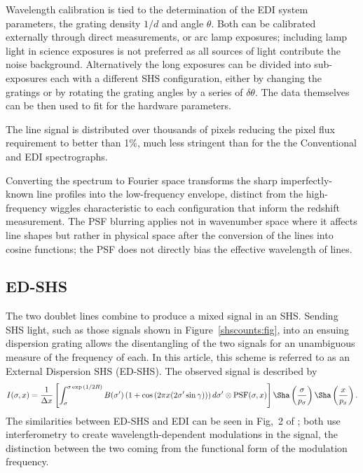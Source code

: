 \documentclass[preprint]{aastex}
\begin{document}
Wavelength calibration is tied to the determination of the EDI system parameters, the grating density $1/d$ and angle $\theta$.
Both can be calibrated externally through direct measurements, or arc lamp exposures; including lamp light
in science exposures is not preferred as all sources of light contribute the noise background.
Alternatively
the long exposures can be divided into sub-exposures each with a different SHS configuration, either by changing the
gratings or by rotating the grating angles by a series of $\delta \theta$.  The data themselves can be then used to fit for
the hardware parameters.

The line signal is distributed over thousands of pixels reducing the pixel flux requirement to better than 1\%, much less stringent
than for the the Conventional and EDI spectrographs.

Converting the spectrum to Fourier space transforms the sharp imperfectly-known line profiles into the low-frequency envelope,
distinct from the high-frequency wiggles characteristic to each configuration that inform the redshift measurement.
The PSF blurring applies not in wavenumber space where it affects
line shapes but rather in physical space after the conversion of the lines into cosine functions; the PSF does not directly bias the effective
wavelength of lines.

\subsection{ED-SHS}
The two doublet lines combine to produce a mixed signal in an SHS.  Sending SHS light, such as those signals shown
in  Figure~\ref{shscounts:fig}, into an ensuing dispersion grating
allows the disentangling of the two signals for an unambiguous measure of the frequency of each.  In this article,
this scheme is 
referred to as an External Dispersion SHS (ED-SHS).
The observed signal is described by
\begin{equation}
I(\sigma,x) = \frac{1}{\Delta x}\left[\int^{\sigma \exp{\left(1/2R\right)}}_{\sigma} B(\sigma')\left(1+\cos{\left(2 \pi x (2\sigma' \sin{\gamma})\right)}\right)d\sigma' \otimes \mbox{PSF}(\sigma,x)\right]\Sha\left(\frac{\sigma}{p_\sigma}\right) \Sha\left(\frac{x}{p_x}\right).
\label{edishssig:eqn}
\end{equation}
The similarities between ED-SHS and EDI can be seen in Fig,\ 2 of \citet{2003PASP..115..255E}; both use
interferometry to create wavelength-dependent modulations in the signal, the distinction between the two coming
from the functional form of
the modulation frequency.
\end{document}
